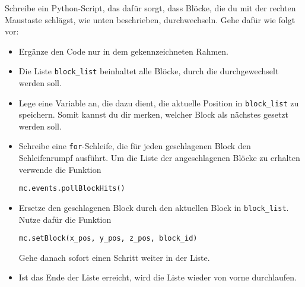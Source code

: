 \large Schreibe ein Python-Script, das dafür sorgt, dass Blöcke, die du mit der rechten Maustaste schlägst, wie unten beschrieben, durchwechseln.
Gehe dafür wie folgt vor:
\begin{itemize}
	\item Ergänze den Code nur in dem gekennzeichneten Rahmen.
	
	\item Die Liste \texttt{block\_list} beinhaltet alle Blöcke, durch die durchgewechselt werden soll.
	
	\item Lege eine Variable an, die dazu dient, die aktuelle Position in \texttt{block\_list} zu speichern. Somit kannst du dir merken, welcher Block als nächstes gesetzt werden soll.
	
	\item Schreibe eine \texttt{for}-Schleife, die für jeden geschlagenen Block den Schleifenrumpf ausführt. Um die Liste der angeschlagenen Blöcke zu erhalten verwende die Funktion
	\begin{lstlisting}
mc.events.pollBlockHits()
	\end{lstlisting}
		
	\item Ersetze den geschlagenen Block durch den aktuellen Block in \texttt{block\_list}. Nutze dafür die Funktion
	\begin{lstlisting}
mc.setBlock(x_pos, y_pos, z_pos, block_id)
	\end{lstlisting}
	Gehe danach sofort einen Schritt weiter in der Liste.
	
	\item Ist das Ende der Liste erreicht, wird die Liste wieder von vorne durchlaufen.
\end{itemize}